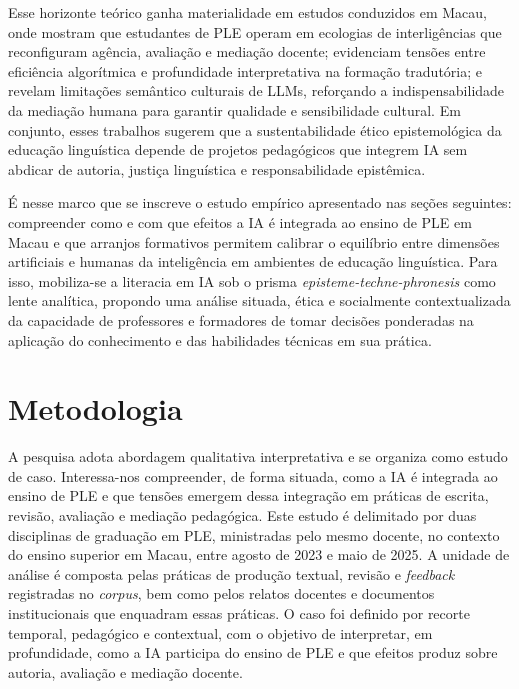 \documentclass[portuguese]{textolivre}
\begin{document}
Esse horizonte teórico ganha materialidade em estudos conduzidos em Macau, onde \textcite{PiresAmaro2025} mostram que estudantes de PLE operam em ecologias de interligências que reconfiguram agência, avaliação e mediação docente; \textcite{AmaroPires2024} evidenciam tensões entre eficiência algorítmica e profundidade interpretativa na formação tradutória; e \textcite{AmaroZhang2025} revelam limitações semântico culturais de LLMs, reforçando a indispensabilidade da mediação humana para garantir qualidade e sensibilidade cultural. Em conjunto, esses trabalhos sugerem que a sustentabilidade ético epistemológica da educação linguística depende de projetos pedagógicos que integrem IA sem abdicar de autoria, justiça linguística e responsabilidade epistêmica.

É nesse marco que se inscreve o estudo empírico apresentado nas seções seguintes: compreender como e com que efeitos a IA é integrada ao ensino de PLE em Macau e que arranjos formativos permitem calibrar o equilíbrio entre dimensões artificiais e humanas da inteligência em ambientes de educação linguística. Para isso, mobiliza-se a literacia em IA sob o prisma \textit{episteme-techne-phronesis} como lente analítica, propondo uma análise situada, ética e socialmente contextualizada da capacidade de professores e formadores de tomar decisões ponderadas na aplicação do conhecimento e das habilidades técnicas em sua prática.

\section{Metodologia}\label{sec-met}
A pesquisa adota abordagem qualitativa interpretativa e se organiza como estudo de caso. Interessa-nos compreender, de forma situada, como a IA é integrada ao ensino de PLE e que tensões emergem dessa integração em práticas de escrita, revisão, avaliação e mediação pedagógica. Este estudo é delimitado por duas disciplinas de graduação em PLE, ministradas pelo mesmo docente, no contexto do ensino superior em Macau, entre agosto de 2023 e maio de 2025. A unidade de análise é composta pelas práticas de produção textual, revisão e \textit{feedback} registradas no \textit{corpus}, bem como pelos relatos docentes e documentos institucionais que enquadram essas práticas. O caso foi definido por recorte temporal, pedagógico e contextual, com o objetivo de interpretar, em profundidade, como a IA participa do ensino de PLE e que efeitos produz sobre autoria, avaliação e mediação docente.
\end{document}
